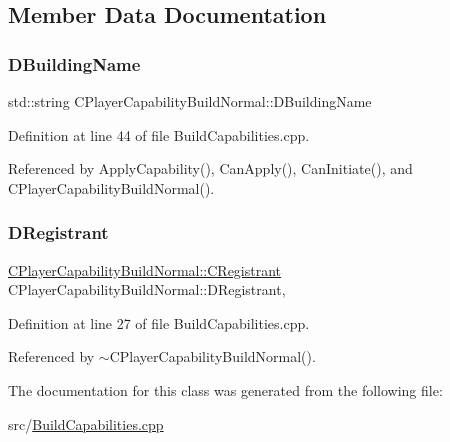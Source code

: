 \subsection{Member Data Documentation}
\hypertarget{classCPlayerCapabilityBuildNormal_aae09d6cee5f8e201a0139c9065a5577c}{}\label{classCPlayerCapabilityBuildNormal_aae09d6cee5f8e201a0139c9065a5577c} 
\subsubsection{\texorpdfstring{D\+Building\+Name}{DBuildingName}}
{\footnotesize\ttfamily std\+::string C\+Player\+Capability\+Build\+Normal\+::\+D\+Building\+Name\hspace{0.3cm}{\ttfamily [protected]}}



Definition at line 44 of file Build\+Capabilities.\+cpp.



Referenced by Apply\+Capability(), Can\+Apply(), Can\+Initiate(), and C\+Player\+Capability\+Build\+Normal().

\hypertarget{classCPlayerCapabilityBuildNormal_a486700cf2553e6ab77340152c9b03242}{}\label{classCPlayerCapabilityBuildNormal_a486700cf2553e6ab77340152c9b03242} 
\subsubsection{\texorpdfstring{D\+Registrant}{DRegistrant}}
{\footnotesize\ttfamily \hyperlink{classCPlayerCapabilityBuildNormal_1_1CRegistrant}{C\+Player\+Capability\+Build\+Normal\+::\+C\+Registrant} C\+Player\+Capability\+Build\+Normal\+::\+D\+Registrant\hspace{0.3cm}{\ttfamily [static]}, {\ttfamily [protected]}}



Definition at line 27 of file Build\+Capabilities.\+cpp.



Referenced by $\sim$\+C\+Player\+Capability\+Build\+Normal().



The documentation for this class was generated from the following file\+:\begin{DoxyCompactItemize}
\item 
src/\hyperlink{BuildCapabilities_8cpp}{Build\+Capabilities.\+cpp}\end{DoxyCompactItemize}

